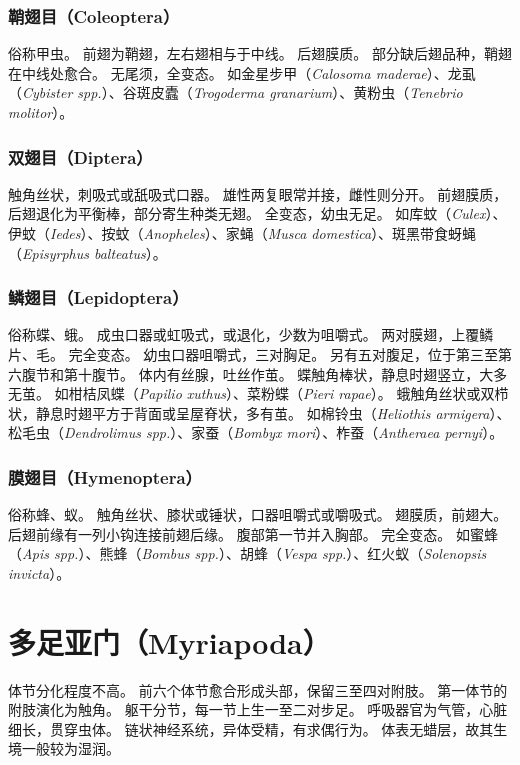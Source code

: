 \documentclass[11pt]{article}
\begin{document}
\subsubsection{鞘翅目（Coleoptera）}
俗称甲虫。
前翅为鞘翅，左右翅相与于中线。
后翅膜质。
部分缺后翅品种，鞘翅在中线处愈合。
无尾须，全变态。
如金星步甲（\textit{Calosoma maderae}）、龙虱（\textit{Cybister spp.}）、谷斑皮蠹（\textit{Trogoderma granarium}）、黄粉虫（\textit{Tenebrio molitor}）。

\subsubsection{双翅目（Diptera）}
触角丝状，刺吸式或舐吸式口器。
雄性两复眼常并接，雌性则分开。
前翅膜质，后翅退化为平衡棒，部分寄生种类无翅。
全变态，幼虫无足。
如库蚊（\textit{Culex}）、伊蚊（\textit{Iedes}）、按蚊（\textit{Anopheles}）、家蝇（\textit{Musca domestica}）、斑黑带食蚜蝇（\textit{Episyrphus balteatus}）。

\subsubsection{鳞翅目（Lepidoptera）}
俗称蝶、蛾。
成虫口器或虹吸式，或退化，少数为咀嚼式。
两对膜翅，上覆鳞片、毛。
完全变态。
幼虫口器咀嚼式，三对胸足。
另有五对腹足，位于第三至第六腹节和第十腹节。
体内有丝腺，吐丝作茧。
蝶触角棒状，静息时翅竖立，大多无茧。
如柑桔凤蝶（\textit{Papilio xuthus}）、菜粉蝶（\textit{Pieri rapae}）。
蛾触角丝状或双栉状，静息时翅平方于背面或呈屋脊状，多有茧。
如棉铃虫（\textit{Heliothis armigera}）、松毛虫（\textit{Dendrolimus spp.}）、家蚕（\textit{Bombyx mori}）、柞蚕（\textit{Antheraea pernyi}）。

\subsubsection{膜翅目（Hymenoptera）}
俗称蜂、蚁。
触角丝状、膝状或锤状，口器咀嚼式或嚼吸式。
翅膜质，前翅大。
后翅前缘有一列小钩连接前翅后缘。
腹部第一节并入胸部。
完全变态。
如蜜蜂（\textit{Apis spp.}）、熊蜂（\textit{Bombus spp.}）、胡蜂（\textit{Vespa spp.}）、红火蚁（\textit{Solenopsis invicta}）。

\section{多足亚门（Myriapoda）}
体节分化程度不高。
前六个体节愈合形成头部，保留三至四对附肢。
第一体节的附肢演化为触角。
躯干分节，每一节上生一至二对步足。
呼吸器官为气管，心脏细长，贯穿虫体。
链状神经系统，异体受精，有求偶行为。
体表无蜡层，故其生境一般较为湿润。
\end{document}
